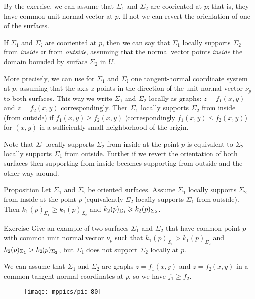 By the exercise, we can assume that $\Sigma_1$ and $\Sigma_2$ are cooriented at $p$;
that is, they have common unit normal vector at $p$.
If not we can revert the orientation of one of the surfaces.

If $\Sigma_1$ and $\Sigma_2$ are cooriented at $p$,
then we can say that $\Sigma_1$ locally supports $\Sigma_2$ from \emph{inside} or from \emph{outside},
assuming that the normal vector points \emph{inside} the domain bounded by surface $\Sigma_2$ in $U$.

More precisely, we can use for $\Sigma_1$ and $\Sigma_2$ one tangent-normal coordinate system at $p$,
assuming that the axis $z$ points in the direction of the unit normal vector $\nu_p$ to both surfaces.
This way we write $\Sigma_1$ and $\Sigma_2$ locally as graphs: $z=f_1(x,y)$  and $z=f_2(x,y)$ correspondingly.
Then $\Sigma_1$ locally supports $\Sigma_2$ from inside (from outside)  if $f_1(x,y)\ge f_2(x,y)$ (correspondingly $f_1(x,y)\le f_2(x,y)$) for $(x,y)$ in a sufficiently small neighborhood of the origin.

Note that $\Sigma_1$ locally supports $\Sigma_2$ from inside at the point $p$ is equivalent to $\Sigma_2$ locally supports $\Sigma_1$ from outside.
Further if we revert the orientation of both surfaces then supporting from inside becomes supporting from outside and the other way around.


\begin{thm}{Proposition}\label{prop:surf-support}
Let $\Sigma_1$ and $\Sigma_2$ be oriented surfaces.
Assume $\Sigma_1$ locally supports $\Sigma_2$ from inside at the point $p$ (equivalently $\Sigma_2$ locally supports $\Sigma_1$ from outside).
Then $k_1(p)_{\Sigma_1}\ge k_1(p)_{\Sigma_2}$ and $k_2(p)_{\Sigma_1}\z\ge k_2(p)_{\Sigma_2}$.
\end{thm}

\begin{thm}{Exercise}\label{ex:surf-support}
Give an example of two surfaces $\Sigma_1$ and $\Sigma_2$ that have common point $p$ with common unit normal vector $\nu_p$ such that 
$k_1(p)_{\Sigma_1}> k_1(p)_{\Sigma_2}$ and $k_2(p)_{\Sigma_1}\z> k_2(p)_{\Sigma_2}$, but $\Sigma_1$ does not support $\Sigma_2$ locally at $p$.
\end{thm}


 We can assume that $\Sigma_1$ and $\Sigma_2$ are graphs $z=f_1(x,y)$  and $z=f_2(x,y)$ in a common tangent-normal coordinates at $p$, so we have $f_1\ge f_2$.

\begin{wrapfigure}{o}{40 mm}
\vskip-4mm
\centering
\texttt{[image: mppics/pic-80]}
\vskip-0mm
\end{wrapfigure}

